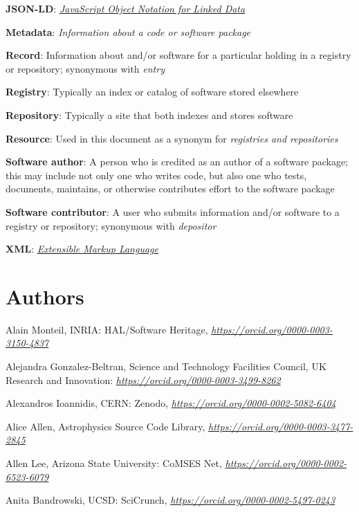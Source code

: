 \documentclass[]{article}
\begin{document}
\textbf{JSON-LD}:
\href{https://en.wikipedia.org/wiki/JSON-LD}{\emph{JavaScript Object
Notation for Linked Data}}

\textbf{Metadata}: \emph{Information about a code or software package}

\textbf{Record}: Information about and/or software for a particular
holding in a registry or repository; synonymous with \emph{entry}

\textbf{Registry}: Typically an index or catalog of software stored
elsewhere

\textbf{Repository}: Typically a site that both indexes and stores
software

\textbf{Resource}: Used in this document as a synonym for
\emph{registries and repositories}

\textbf{Software author}: A person who is credited as an author of a
software package; this may include not only one who writes code, but
also one who tests, documents, maintains, or otherwise contributes
effort to the software package

\textbf{Software contributor}: A user who submits information and/or
software to a registry or repository; synonymous with \emph{depositor}

\textbf{XML}: \href{https://en.wikipedia.org/wiki/XML}{\emph{Extensible
Markup Language}}

\newpage
\section{Authors}\label{authors}

Alain Monteil, INRIA: HAL/Software Heritage,
\href{https://orcid.org/0000-0003-3150-4837}{\emph{https://orcid.org/0000-0003-3150-4837}}

Alejandra Gonzalez-Beltran, Science and Technology Facilities Council,
UK Research and Innovation:
\href{https://orcid.org/0000-0003-3499-8262}{\emph{https://orcid.org/0000-0003-3499-8262}}

Alexandros Ioannidis, CERN: Zenodo,
\href{https://orcid.org/0000-0002-5082-6404}{\emph{https://orcid.org/0000-0002-5082-6404}}

Alice Allen, Astrophysics Source Code Library,
\href{https://orcid.org/0000-0003-3477-2845}{\emph{https://orcid.org/0000-0003-3477-2845}}

Allen Lee, Arizona State University: CoMSES Net,
\href{https://orcid.org/0000-0002-6523-6079}{\emph{https://orcid.org/0000-0002-6523-6079}}

Anita Bandrowski, UCSD: SciCrunch,
\href{https://orcid.org/0000-0002-5497-0243}{\emph{https://orcid.org/0000-0002-5497-0243}}
\end{document}
